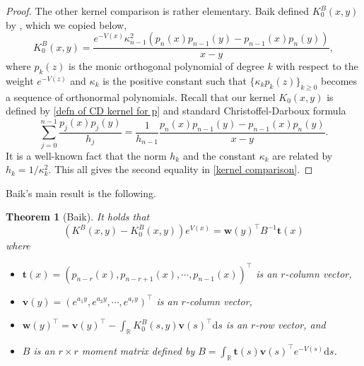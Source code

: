 \documentclass[a4paper,10pt,leqno]{amsart}
\numberwithin{equation}{section}
\newtheorem{theorem}{Theorem}[section]
\theoremstyle{remark}
\newcommand{\dd}{\mathrm{d}}
\newcommand{\R}{\mathbb{R}}
\begin{document}
\begin{proof}
The other kernel comparison is rather elementary. Baik defined $K^B_0(x,y)$ by \cite[Equation (14)]{Bai09}, which we copied below,
\[
K^B_0(x,y) = \frac{e^{-V(x)} \kappa_{n-1}^2 \left( p_{n}(x) p_{n-1}(y) - p_{n-1}(x) p_{n}(y) \right)}{x-y},
\]
where $p_{k}(z)$ is the monic orthogonal polynomial of degree $k$ with respect to the weight $e^{-V(z)}$ and $\kappa_k$ is the positive constant such that $\{ \kappa_k p_{k}(z) \}_{k\geq 0}$ becomes a sequence of orthonormal polynomials. 
Recall that our kernel $K_0(x,y)$ is defined by \eqref{defn of CD kernel for p} and standard Christoffel-Darboux formula
\[
\sum_{j=0}^{n-1}\frac{p_j(x)p_j(y)}{h_j} = \frac{1}{h_{n-1}}\frac{p_n(x)p_{n-1}(y) - p_{n-1}(x)p_n(y)}{x-y}.
\]
It is a well-known fact that the norm $h_k$ and the constant $\kappa_k$ are related by $h_k = 1/\kappa_k^2$. This all gives the second equality in \eqref{kernel comparison}.
\end{proof}

Baik's main result \cite{Bai09} is the following.
\begin{theorem}[Baik]
It holds that
\begin{equation}\label{Baik's formula}
    \left( K^B(x,y)-K^B_0(x,y) \right) e^{V(x)}= \mathbf{w}(y)^\top B^{-1}\mathbf{t}(x)
\end{equation}
where 
\begin{itemize}
    \item $\mathbf{t}(x) = \left( p_{n-r}(x), p_{n-r+1}(x), \cdots, p_{n-1}(x) \right)^\top$ is an $r$-column vector,
    \item $\mathbf{v}(y) = (e^{a_1 y}, e^{a_2 y}, \cdots, e^{a_r y})^\top$ is an $r$-column vector,
    \item $\mathbf{w}(y)^\top = \mathbf{v}(y)^\top - \int_\R K^B_{0}(s,y)\mathbf{v}(s)^\top \dd s$ is an $r$-row vector, and
    \item $B$ is an $r \times r$ moment matrix defined by $B = \int_\R \mathbf{t}(s)\mathbf{v}(s)^\top e^{-V(s)} \dd s$.
\end{itemize}
\end{theorem}
\end{document}
